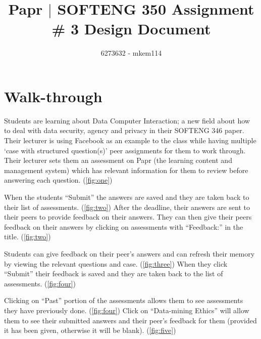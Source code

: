 \documentclass[10pt,a4paper]{article}
\author{6273632 - mkem114}
\title{Papr $|$ SOFTENG 350 Assignment \# 3 Design Document}
\begin{document}
	\pagestyle{fancy}
	\fancyhf{}
	\renewcommand{\headrulewidth}{5pt}
	\renewcommand{\headrule}{\hbox to\headwidth{%
	  \color{orangeBack}\leaders\hrule height \headrulewidth\hfill}}
	\renewcommand{\footrulewidth}{5pt}
	\renewcommand{\footrule}{\hbox to\headwidth{%
	  \color{orangeBack}\leaders\hrule height \footrulewidth\hfill}}
	\renewcommand{\cftsecleader}{\cftdotfill{\cftdotsep}}
	\lfoot{\theauthor}
	\renewcommand{\contentsname}{Table of Contents}

\maketitle
\tableofcontents
\listoffigures
\newpage

\section{Walk-through}
	Students are learning about Data Computer Interaction; a new field about how to deal with data security, agency and privacy in their SOFTENG 346 paper. Their lecturer is using Facebook as an example to the class while having multiple `case with structured question(s)' peer assignments for them to work through.\\
	
	Their lecturer sets them an assessment on Papr (the learning content and management system) which has relevant information for them to review before answering each question. (\cref{fig:one})
	
	When the students ``Submit'' the answers are saved and they are taken back to their list of assessments. (\cref{fig:two}) After the deadline, their answers are sent to their peers to provide feedback on their answers. They can then give their peers feedback on their answers by clicking on assessments with ``Feedback:'' in the title. (\cref{fig:two})
	
	Students can give feedback on their peer's answers and can refresh their memory by viewing the relevant questions and case. (\cref{fig:three}) When they click ``Submit'' their feedback is saved and they are taken back to the list of assessments. (\cref{fig:four})
	
	Clicking on ``Past'' portion of the assessments allows them to see assessments they have previously done. (\cref{fig:four}) Click on ``Data-mining Ethics'' will allow them to see their submitted answers and their peer's feedback for them (provided it has been given, otherwise it will be blank). (\cref{fig:five}) 
	
\end{document}
